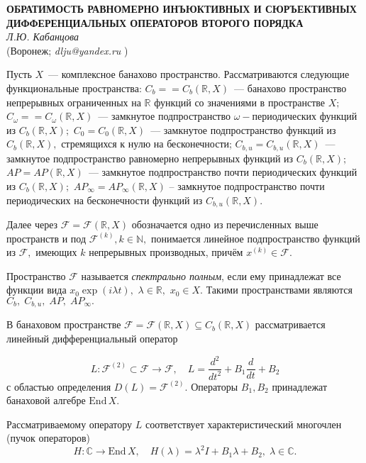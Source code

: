 \begin{center}{ \bf  ОБРАТИМОСТЬ РАВНОМЕРНО ИНЪЮКТИВНЫХ И СЮРЪЕКТИВНЫХ ДИФФЕРЕНЦИАЛЬНЫХ ОПЕРАТОРОВ ВТОРОГО ПОРЯДКА}\\
{\it Л.Ю. Кабанцова } \\
(Воронеж; {\it dlju@yandex.ru} )
\end{center}

Пусть $X$~--- комплексное
банахово пространство.
Рассматриваются следующие функциональные пространства:
$C_b=
$\linebreak $=
C_b(\mathbb{R},X)$~--- банахово пространство непрерывных
ограниченных на $\mathbb{R}$ функций со значениями в пространстве $X;$
$C_\omega=
$\linebreak $=
C_\omega(\mathbb{R},X)$~--- замкнутое подпространство $\omega-$периодических фу\-н\-к\-ций из $C_b(\mathbb{R},X);$
$C_0=C_0(\mathbb{R},X)$~--- замкнутое подпространство функций из $C_b(\mathbb{R},X),$ стремящихся к нулю на бесконечности;
$C_{b,u}=C_{b,u}(\mathbb{R},X)$~--- замкнутое подпространство равномерно непрерывных функций из $C_b(\mathbb{R},X);$
$AP=AP(\mathbb{R},X)$~--- замкнутое подпространство почти периодических функций из
$C_b(\mathbb{R},X);$ $AP_{\infty}=AP_{\infty}(\mathbb{R},X)$ -- замкнутое подпространство почти периодических
на бесконечности функций из $C_{b,u}(\mathbb{R},X).$

Далее через $\mathcal{F}=\mathcal{F}(\mathbb{R},X)$ обозначается одно из перечисленных выше пространств
и под $\mathcal{F}^{(k)}, k\in\mathbb{N},$ понимается линейное подпространство функций из $\mathcal{F},$
имеющих $k$ непрерывных производных, причём $x^{(k)}\in \mathcal{F}$.

Пространство $\mathcal{F}$ называется {\it спектрально полным},
если ему принадлежат все функции вида $x_0\exp(i\lambda t),$ $\lambda\in\mathbb{R},$ $x_0 \in X.$
Такими пространствами являются  $C_b,\;C_{b,u},\;AP,\;AP_{\infty}.$

В банаховом пространстве $\mathcal{F}=\mathcal{F}(\mathbb{R}, X)\subseteq C_b (\mathbb{R}, X)$
рассматривается линейный дифференциальный оператор

$$L: \mathcal{F}^{(2)}\subset \mathcal{F}\rightarrow\mathcal{F}, \quad L=\frac {d^2}{dt^2}+B_1\frac {d}{dt}+B_2$$
с областью определения $D(L)=\mathcal{F}^{(2)}.$ Операторы $B_1, B_2$ принадлежат банаховой алгебре $\mathrm{End}\, X.$

Рассматриваемому оператору $L$ соответствует характеристический многочлен (пучок операторов)
$$H:\mathbb{C}\rightarrow \mathrm{End}\,X, \quad H(\lambda)=\lambda^2 I+B_1\lambda+B_2,\;\lambda \in\mathbb{C}.$$

